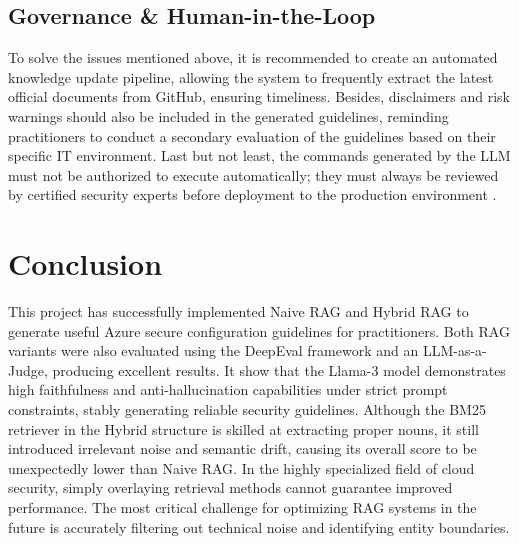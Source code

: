 \documentclass[11pt]{article}
\begin{document}
\subsection{Governance \& Human-in-the-Loop}

To solve the issues mentioned above, it is recommended to create an automated knowledge update pipeline, allowing the system to frequently extract the latest official documents from GitHub, ensuring timeliness. Besides, disclaimers and risk warnings should also be included in the generated guidelines, reminding practitioners to conduct a secondary evaluation of the guidelines based on their specific IT environment. Last but not least, the commands generated by the LLM must not be authorized to execute automatically; they must always be reviewed by certified security experts before deployment to the production environment \citep{zhang2024trustworthy}.

\section{Conclusion}

This project has successfully implemented Naive RAG and Hybrid RAG to generate useful Azure secure configuration guidelines for practitioners. Both RAG variants were also evaluated using the DeepEval framework and an LLM-as-a-Judge, producing excellent results. It show that the Llama-3 model demonstrates high faithfulness and anti-hallucination capabilities under strict prompt constraints, stably generating reliable security guidelines. Although the BM25 retriever in the Hybrid structure is skilled at extracting proper nouns, it still introduced irrelevant noise and semantic drift, causing its overall score to be unexpectedly lower than Naive RAG. In the highly specialized field of cloud security, simply overlaying retrieval methods cannot guarantee improved performance. The most critical challenge for optimizing RAG systems in the future is accurately filtering out technical noise and identifying entity boundaries.



\end{document}
